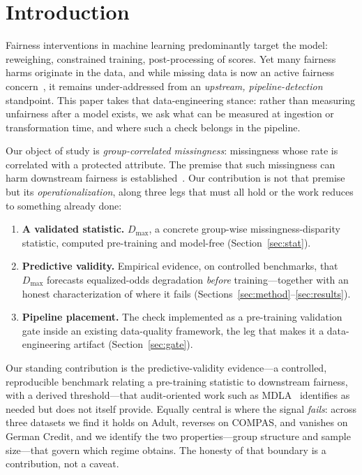 \documentclass[sigconf,nonacm]{acmart}
\begin{document}

\maketitle

\section{Introduction}
Fairness interventions in machine learning predominantly target the model: reweighing,
constrained training, post-processing of scores. Yet many fairness harms originate in the
data, and while missing data is now an active fairness concern~\cite{martinezplumed2021}, it
remains under-addressed from an \emph{upstream, pipeline-detection} standpoint. This paper takes
that data-engineering stance: rather than measuring unfairness after a model exists, we ask what
can be measured at ingestion or transformation time, and where such a check belongs in the
pipeline.

Our object of study is \emph{group-correlated missingness}: missingness whose rate is
correlated with a protected attribute. The premise that such missingness can harm downstream
fairness is established~\cite{goel2021,wangsingh2021,min2025}. Our contribution is not that
premise but its \emph{operationalization}, along three legs that must all hold or the work
reduces to something already done:
\begin{enumerate}
\item \textbf{A validated statistic.} $D_{\max}$, a concrete group-wise
missingness-disparity statistic, computed pre-training and model-free
(Section~\ref{sec:stat}).
\item \textbf{Predictive validity.} Empirical evidence, on controlled benchmarks, that
$D_{\max}$ forecasts equalized-odds degradation \emph{before} training---together with an
honest characterization of where it fails (Sections~\ref{sec:method}--\ref{sec:results}).
\item \textbf{Pipeline placement.} The check implemented as a pre-training validation gate
inside an existing data-quality framework, the leg that makes it a data-engineering artifact
(Section~\ref{sec:gate}).
\end{enumerate}
Our standing contribution is the predictive-validity evidence---a controlled, reproducible
benchmark relating a pre-training statistic to downstream fairness, with a derived threshold---that
audit-oriented work such as MDLA~\cite{mdla2026} identifies as needed but does not itself provide.
Equally central is where the signal \emph{fails}: across three datasets we find it holds on
Adult, reverses on COMPAS, and vanishes on German Credit, and we identify the two
properties---group structure and sample size---that govern which regime obtains. The honesty of
that boundary is a contribution, not a caveat.
\end{document}
